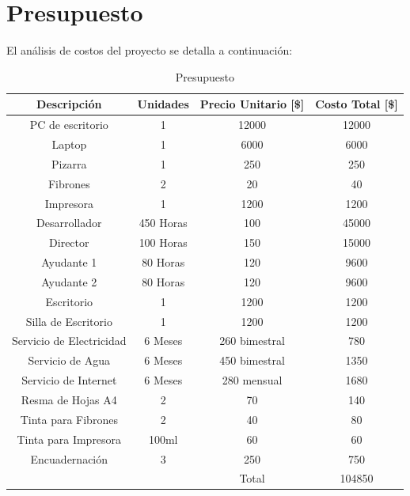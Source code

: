\documentclass[a4paper, 10pt, oneside]{book}
\begin{document}
    \section{Presupuesto}\label{sec:presupuesto}


    El análisis de costos del proyecto se detalla a continuación:

    \begin{table}[h]
        \small
        \label{tabla:presupuesto}
        \caption{Presupuesto}
        \begin{tabular}{|c|c|c|c|}
            \hline
            \textbf{Descripción} & \textbf{Unidades} & \textbf{Precio Unitario} [\$] & \textbf{Costo Total} [\$] \\ \hline
            PC de escritorio & 1 & 12000 & 12000 \\ %
            Laptop & 1 & 6000 & 6000 \\ %
            Pizarra & 1 & 250 & 250 \\ %
            Fibrones & 2 & 20 & 40 \\ %
            Impresora & 1 & 1200 & 1200 \\ %
            Desarrollador & 450 Horas & 100 & 45000 \\ %
            Director & 100 Horas & 150 & 15000 \\ %
            Ayudante 1 & 80 Horas & 120 & 9600 \\ %
            Ayudante 2 & 80 Horas & 120 & 9600 \\ %
            Escritorio & 1 & 1200 & 1200 \\ %
            Silla de Escritorio & 1 & 1200 & 1200 \\ %
            Servicio de Electricidad & 6 Meses & 260 bimestral & 780 \\ %
            Servicio de Agua & 6 Meses & 450 bimestral & 1350 \\ %
            Servicio de Internet & 6 Meses & 280 mensual & 1680 \\ %
            Resma de Hojas A4 & 2 & 70 & 140 \\ %
            Tinta para Fibrones & 2 & 40 & 80 \\ %
            Tinta para Impresora & 100ml & 60 & 60 \\ %
            Encuadernación & 3 & 250 & 750 \\ \hline
            & & Total & 104850\\ \hline
        \end{tabular}
    \end{table}
\end{document}
